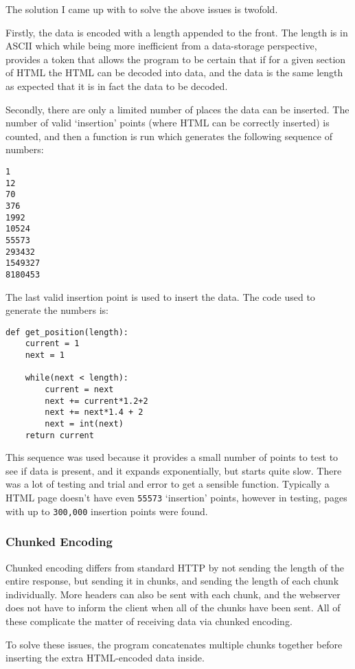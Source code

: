 The solution I came up with to solve the above issues is twofold.\par
Firstly, the data is encoded with a length appended to the front.
The length is in ASCII which while being more inefficient from a data-storage perspective, provides a token that allows the program to be certain that if for a given section of HTML the HTML can be decoded into data, and the data is the same length as expected that it is in fact the data to be decoded.\par
Secondly, there are only a limited number of places the data can be inserted. The number of valid `insertion' points (where HTML can be correctly inserted) is counted, and then a function is run which generates the following sequence of numbers:
\begin{lstlisting}
1
12
70
376
1992
10524
55573
293432
1549327
8180453
\end{lstlisting}
The last valid insertion point is used to insert the data.
The code used to generate the numbers is:
\begin{lstlisting}
def get_position(length):
    current = 1
    next = 1

    while(next < length):
        current = next
        next += current*1.2+2
        next += next*1.4 + 2
        next = int(next)
    return current
\end{lstlisting}
This sequence was used because it provides a small number of points to test to see if data is present, and it expands exponentially, but starts quite slow. There was a lot of testing and trial and error to get a sensible function.
Typically a HTML page doesn't have even \texttt{55573} `insertion' points, however in testing, pages with up to \texttt{300,000} insertion points were found.

\subsubsection{Chunked Encoding}
Chunked encoding differs from standard HTTP by not sending the length of the entire response, but sending it in chunks, and sending the length of each chunk individually.
More headers can also be sent with each chunk, and the webserver does not have to inform the client when all of the chunks have been sent. All of these complicate the matter of receiving data via chunked encoding.\par
To solve these issues, the program concatenates multiple chunks together before inserting the extra HTML-encoded data inside.

